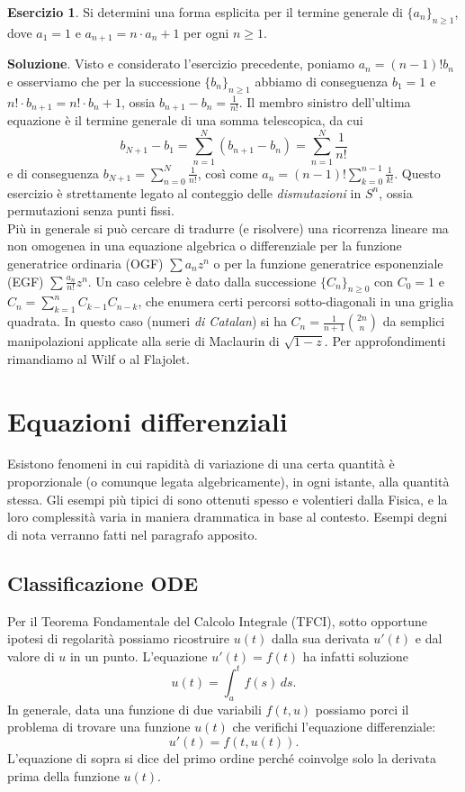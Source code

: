 \documentclass[a4paper,twoside]{article}
\theoremstyle{definition}
\newtheorem{ex}[theorem]{Esercizio}
\numberwithin{theorem}{section}
\begin{document}
\begin{ex} Si determini una forma esplicita per il termine generale di $\{a_n\}_{n\geq 1}$, dove $a_1=1$ e $a_{n+1}=n\cdot a_n + 1$ per ogni $n\geq 1$.
\end{ex}
\textbf{Soluzione}. Visto e considerato l'esercizio precedente, poniamo $a_n=(n-1)! b_n$ e osserviamo che per la successione $\{b_n\}_{n\geq 1}$ abbiamo di conseguenza $b_1=1$ e $n!\cdot b_{n+1} = n!\cdot b_n + 1$, ossia $b_{n+1}-b_n=\frac{1}{n!}$. Il membro sinistro dell'ultima equazione è il termine generale di una somma telescopica, da cui 
$$ b_{N+1}-b_1 = \sum_{n=1}^{N}\left(b_{n+1}-b_n\right) = \sum_{n=1}^{N}\frac{1}{n!}$$
e di conseguenza $b_{N+1}=\sum_{n=0}^{N}\frac{1}{n!}$, così come $a_n = (n-1)!\sum_{k=0}^{n-1}\frac{1}{k!}$. 
Questo esercizio è strettamente legato al conteggio delle \emph{dismutazioni} in $S^n$, ossia permutazioni senza punti fissi.\\


Più in generale si può cercare di tradurre (e risolvere) una ricorrenza lineare ma non omogenea in una equazione algebrica o differenziale per la funzione generatrice ordinaria (OGF) $\sum a_n z^n$ o per la funzione generatrice esponenziale (EGF) $\sum \frac{a_n}{n!} z^n$. Un caso celebre è dato dalla successione $\{C_n\}_{n\geq 0}$ con $C_0=1$ e $C_n=\sum_{k=1}^{n}C_{k-1}C_{n-k}$, che enumera certi percorsi sotto-diagonali in una griglia quadrata. In questo caso (numeri \emph{di Catalan}) si ha $C_n=\frac{1}{n+1}\binom{2n}{n}$ da semplici manipolazioni applicate alla serie di Maclaurin di $\sqrt{1-z}$. Per approfondimenti rimandiamo al Wilf o al Flajolet.


\section{Equazioni differenziali}
Esistono fenomeni in cui rapidità di variazione di una certa quantità è proporzionale (o comunque legata algebricamente), in ogni istante, alla quantità stessa.
Gli esempi più tipici di sono ottenuti spesso e volentieri dalla Fisica, e la loro complessità varia in maniera drammatica in base al contesto. Esempi degni di nota verranno fatti nel paragrafo apposito.

\subsection{Classificazione ODE}
Per il Teorema Fondamentale del Calcolo Integrale (TFCI), sotto opportune ipotesi di regolarità possiamo ricostruire $u(t)$ dalla sua derivata $u'(t)$ e dal valore di $u$ in un punto. L'equazione $u'(t)=f(t)$ ha infatti soluzione $$u(t)=\int_{a}^{t}f(s)\,ds.$$
In generale, data una funzione di due variabili $f(t,u)$ possiamo porci il problema di trovare una funzione $u(t)$ che verifichi l'equazione differenziale:$$u'(t)=f(t,u(t)).$$
L'equazione di sopra si dice del primo ordine perché coinvolge solo la derivata prima della funzione $u(t)$.
\end{document}
